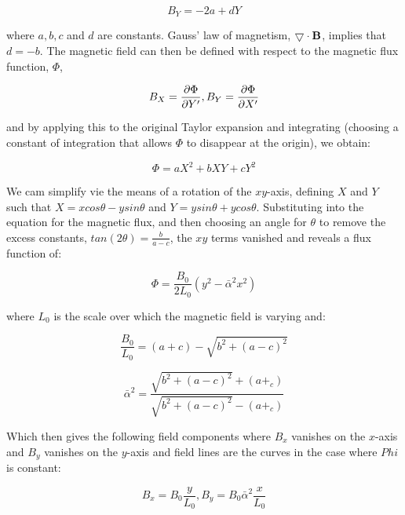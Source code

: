 \begin{equation}
	B_Y = -2a + dY
\end{equation}

where $a, b, c$ and $d$ are constants.
Gauss' law of magnetism, $\bigtriangledown \cdot \mathbf{B}$, implies that $d = -b$.
The magnetic field can then be defined with respect to the magnetic flux function, $\Phi$,

\begin{equation}
	B_X = \frac{\partial \Phi}{\partial Y' }, B_Y = \frac{\partial \Phi}{\partial X' }
\end{equation}  

and by applying this to the original Taylor expansion and integrating (choosing a constant of integration that allows $\Phi$ to disappear at the origin), we obtain:

\begin{equation}
	\Phi = aX^2 + bXY + cY^2
\end{equation}

We cam simplify vie the means of a rotation of the $xy$-axis, defining $X$ and $Y$ such that $X = xcos\theta - y sin\theta$ and $ Y = y sin\theta + y cos\theta$.
Substituting into the equation for the magnetic flux, and then choosing an angle for $\theta$ to remove the excess constants, $tan(2\theta) = \frac{b}{a - c}$, the $xy$ terms vanished and reveals a flux function of:

\begin{equation}
	\Phi = \frac{B_0}{2L_0}(y^2 - \bar{\alpha}^2x^2)
\end{equation}

where $L_0$ is the scale over which the magnetic field is varying and: 

\begin{equation}
	\frac{B_0}{L_0} = (a + c) - \sqrt{b^2 + (a - c)^2}
\end{equation}	
	
\begin{equation}
	\bar{\alpha}^2 = \frac{\sqrt{b^2 + (a - c)^2} + (a +_c)}{\sqrt{b^2 + (a - c)^2} - (a +_c)}
\end{equation}

Which then gives the following field components where $B_x$ vanishes on the $x$-axis and $B_y$ vanishes on the $y$-axis and field lines are the curves in the case where $Phi$ is constant:

\begin{equation}
	B_x = B_0\frac{y}{L_0}, B_y = B_0\bar{\alpha}^2\frac{x}{L_0}
\end{equation}

